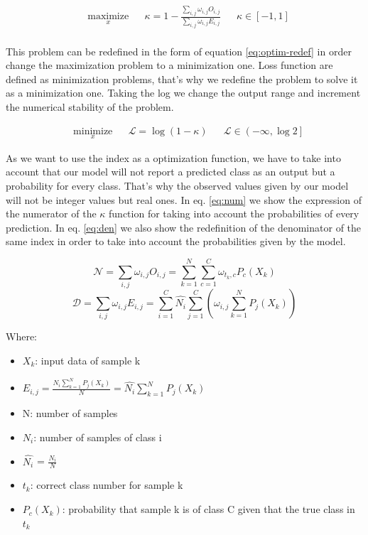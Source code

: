 \documentclass[times,twocolumn,final,authoryear]{elsarticle}
\begin{document}
\begin{equation}
\label{eq:optim}
\begin{aligned}
& \underset{x}{\text{maximize}}
& & \kappa = 1 - \frac{ \sum_{i,j} \omega_{i,j} O_{i,j} }
{\sum_{i,j} \omega_{i,j} E_{i,j}} & & \kappa \in [-1,1]\\
\end{aligned}
\end{equation}

This problem can be redefined in the form of equation \ref{eq:optim-redef} in order change the maximization problem to a minimization one. Loss function are defined as minimization problems, that's why we redefine the problem to solve it as a minimization one. Taking the log we change the output range and increment the numerical stability of the problem.

\begin{equation}
\label{eq:optim-redef}
\begin{aligned}
& \underset{x}{\text{minimize}}
& & \mathcal{L} = \log{\left( 1 - \kappa \right)}  & & \mathcal{L} \in \left(-\infty,\log{2}\right]
\end{aligned}
\end{equation}


As we want to use the index as a optimization function, we have to take into account that our model will not report a predicted class as an output but a probability for every class. That's why the observed values given by our model will not be integer values but real ones. In eq. \ref{eq:num} we show the expression of the numerator of the $\kappa$ function for taking into account the probabilities of every prediction. In eq. \ref{eq:den} we also show the redefinition of the denominator of the same index in order to take into account the probabilities given by the model. 

\begin{equation}
\label{eq:num}
 \mathcal{N} = \sum_{i,j} \omega_{i,j} O_{i,j} = \sum_{k=1}^N \sum_{c=1}^C \omega_{t_k,c} P_c(X_k) 
\end{equation}
\begin{equation}
\label{eq:den}
\mathcal{D} = \sum_{i,j} \omega_{i,j} E_{i,j} = \sum_{i=1}^C \hat{N_i} \sum_{j=1}^C \left( \omega_{i,j} \sum_{k=1}^N P_j(X_k)\right)
\end{equation}

Where:
\begin{itemize}
	\item[] $X_k$: input data of sample k
	\item[] $E_{i,j} = \frac{N_i \sum_{k=1}^N P_j(X_k)}{N} = \hat{N_i} \sum_{k=1}^N P_j(X_k)$
	\item[] N: number of samples
	\item[] $N_i$: number of samples of class i
	\item[] $\hat{N_i}$ = $\frac{N_i}{N}$	
	\item[] $t_k$: correct class number for sample k
	\item[] $P_c(X_k)$: probability that sample k is of class C given that the true class in $t_k$
\end{itemize}
\end{document}
